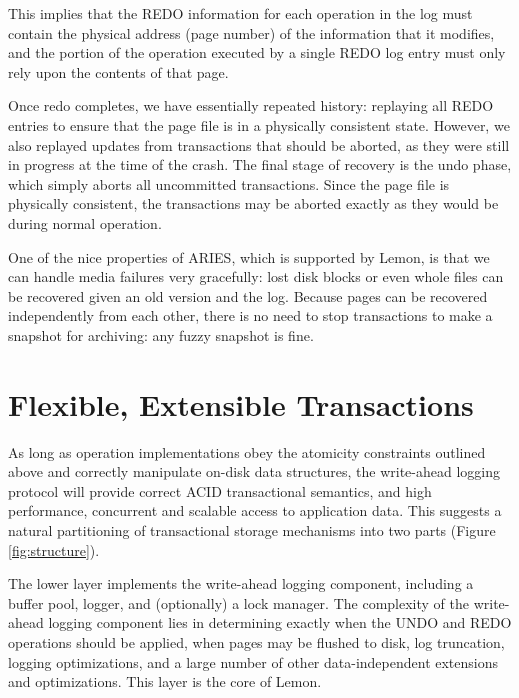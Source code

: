 \documentclass[10pt,letterpaper,twocolumn,english]{article}
\newcommand{\yad}{Lemon\xspace}
\begin{document}
This implies that the REDO information for each operation in the log
must contain the physical address (page number) of the information
that it modifies, and the portion of the operation executed by a
single REDO log entry must only rely upon the contents of that
page.

Once redo completes, we have essentially repeated history: replaying
all REDO entries to ensure that the page file is in a physically
consistent state.  However, we also replayed updates from transactions
that should be aborted, as they were still in progress at the time of
the crash.  The final stage of recovery is the undo phase, which simply
aborts all uncommitted transactions. Since the page file is physically
consistent, the transactions may be aborted exactly as they would be
during normal operation.

One of the nice properties of ARIES, which is supported by \yad,
is that we can handle media failures very gracefully: lost disk blocks
or even whole files can be recovered given an old version and the log.
Because pages can be recovered independently from each other, there is
no need to stop transactions to make a snapshot for archiving: any
fuzzy snapshot is fine.



\section{Flexible, Extensible Transactions}
\label{flexibility}



As long as operation implementations obey the atomicity constraints
outlined above and correctly manipulate
on-disk data structures, the write-ahead logging protocol will provide 
correct ACID transactional semantics, and high performance, concurrent and scalable access to
application data.  This suggests a
natural partitioning of transactional storage mechanisms into two
parts (Figure \ref{fig:structure}).

The lower layer implements the write-ahead logging component,
including a buffer pool, logger, and (optionally) a lock manager.  
The complexity of the write-ahead logging component lies in
determining exactly when the UNDO and REDO operations should be
applied, when pages may be flushed to disk, log truncation, logging
optimizations, and a large number of other data-independent extensions
and optimizations.  This layer is the core of \yad.
\end{document}
